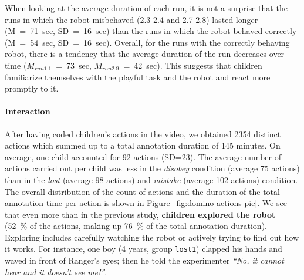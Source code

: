 \documentclass{sig-alternate}
\begin{document}
When looking at the average duration of each run, it is not a surprise that the
runs in which the robot misbehaved (2.3-2.4 and 2.7-2.8) lasted longer
(M~=~71~sec, SD~=~16~sec) than the runs in which the robot behaved correctly
(M~=~54~sec, SD~=~16~sec). Overall, for the runs with the correctly behaving
robot, there is a tendency that the average duration of the run decreases over
time ($M_{run1.1}$~=~73~sec, $M_{run2.9}$~=~42~sec). This suggests that children
familiarize themselves with the playful task and the robot and react more
promptly to it.


\paragraph{Interaction}
	 
%

After having coded children's actions in the video, we obtained 2354 distinct
actions which summed up to a total annotation duration of 145 minutes. On
average, one child accounted for 92 actions (SD=23). The average number of
actions carried out per child was less in the \textit{disobey} condition
(average 75 actions) than in the \textit{lost} (average 98 actions) and
\textit{mistake} (average 102 actions) condition. The overall distribution of
the count of actions and the duration of the total annotation time per action is
shown in Figure~\ref{fig:domino-actions-pie}. We see that even more than in the
previous study, \textbf{children explored the robot} (52~\% of the actions,
making up 76~\% of the total annotation duration). Exploring includes carefully
watching the robot or actively trying to find out how it works. For instance,
one boy (4 years, group \texttt{lost1}) clapped his hands and waved in front of
Ranger's eyes; then he told the experimenter \textit{``No, it cannot hear and it
doesn't see me!''}.\\ 
\end{document}
